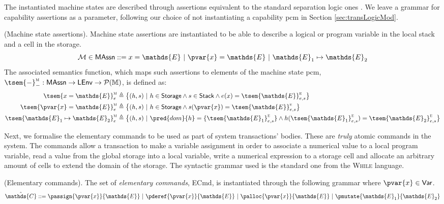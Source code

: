 The instantiated machine states are described through assertions equivalent to the standard separation logic ones \cite{seplogic}. We leave a grammar for capability assertions as a parameter, following our choice of not instantiating a capability pcm in Section \ref{sec:transLogicMod}.
\begin{defn}
	(Machine state assertions).
	Machine state assertions are instantiated to be able to describe a logical or program variable in the local stack and a cell in the storage.
		\[
			\mathcal{M} \in \mathsf{MAssn} ::= x = \mathds{E}\ |\ \pvar{x} = \mathds{E}\ |\ \mathds{E}_1 \mapsto \mathds{E}_2
		\]
		The associated semantics function, which maps such assertions to elements of the machine state pcm, $\tsem{-}_-^\textsc{m} : \mathsf{MAssn} \rightarrow \mathsf{LEnv} \rightarrow \mathcal{P}(\mathbb{M})$, is defined as:
		\begin{align*}
			\tsem{x = \mathds{E}}^\textsc{m}_e &\triangleq \big\{ (h, s)\ |\ h \in \mathsf{Storage} \land s \in \mathsf{Stack} \land  e(x) = \tsem{\mathds{E}}^\textsc{e}_{e, s} \big\}
			\\
			\tsem{\pvar{x} = \mathds{E}}^\textsc{m}_e &\triangleq \big\{ (h, s)\ |\ h \in \mathsf{Storage} \land s(\pvar{x}) = \tsem{\mathds{E}}^\textsc{e}_{e, s} \big\}
			\\
			\tsem{\mathds{E}_1 \mapsto \mathds{E}_2}_e^\textsc{m} &\triangleq \big\{ (h, s)\ |\ \pred{dom}{h} = \{\tsem{\mathds{E}_1}_{e,s}^\textsc{e}\} \land h(\tsem{\mathds{E}_1}_{e,s}^\textsc{e}) = \tsem{\mathds{E}_2}_{e,s}^\textsc{e} \big\}
		\end{align*}
\end{defn}

Next, we formalise the elementary commands to be used as part of system transactions' bodies. These are \textit{truly} atomic commands in the system. The commands allow a transaction to make a variable assignment in order to associate a numerical value to a local program variable, read a value from the global storage into a local variable, write a numerical expression to a storage cell and allocate an arbitrary amount of cells to extend the domain of the storage. The syntactic grammar used is the standard one from the \textsc{While} language.
\begin{defn}
	\label{defn:ecmd}
	(Elementary commands).
	The set of \emph{elementary commands}, \textsf{ECmd}, is instantiated through the following grammar where $\pvar{x} \in \mathsf{Var}$.
	\[
		\hat{\mathds{C}} ::=
			\passign{\pvar{x}}{\mathds{E}}\
			|\ \pderef{\pvar{x}}{\mathds{E}}\
			|\ \palloc{\pvar{x}}{\mathds{E}}\
			|\ \pmutate{\mathds{E}_1}{\mathds{E}_2}
	\]
\end{defn}

